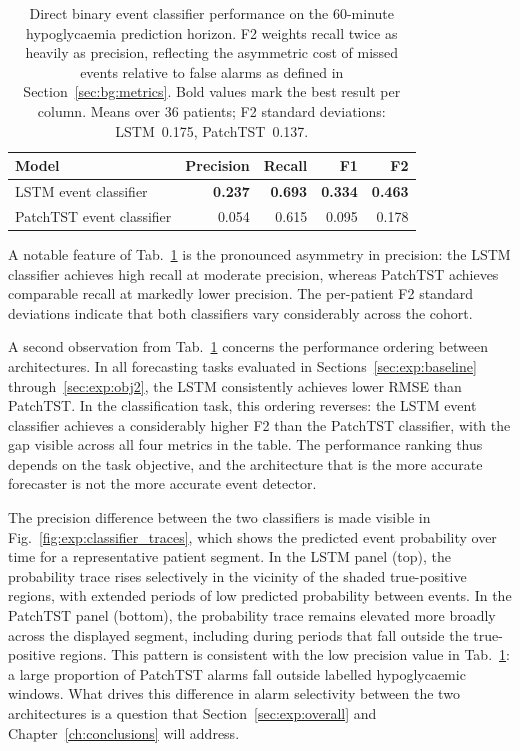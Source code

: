 \begin{table}[tbp]
\centering
\small
\caption{Direct binary event classifier performance on the 60-minute hypoglycaemia prediction horizon. F2 weights recall twice as heavily as precision, reflecting the asymmetric cost of missed events relative to false alarms as defined in Section~\ref{sec:bg:metrics}. Bold values mark the best result per column. Means over 36 patients; F2 standard deviations: LSTM~0.175, PatchTST~0.137.}
\label{tab:exp:classifiers}
\begin{tabular}{lrrrr}
\toprule
Model & Precision & Recall & F1 & F2 \\
\midrule
LSTM event classifier     & \textbf{0.237} & \textbf{0.693} & \textbf{0.334} & \textbf{0.463} \\
PatchTST event classifier & 0.054          & 0.615          & 0.095          & 0.178          \\
\bottomrule
\end{tabular}
\end{table}

A notable feature of Tab.~\ref{tab:exp:classifiers} is the pronounced asymmetry in precision: the LSTM classifier achieves high recall at moderate precision, whereas PatchTST achieves comparable recall at markedly lower precision. The per-patient F2 standard deviations indicate that both classifiers vary considerably across the cohort.

A second observation from Tab.~\ref{tab:exp:classifiers} concerns the performance ordering between architectures. In all forecasting tasks evaluated in Sections~\ref{sec:exp:baseline} through~\ref{sec:exp:obj2}, the LSTM consistently achieves lower RMSE than PatchTST. In the classification task, this ordering reverses: the LSTM event classifier achieves a considerably higher F2 than the PatchTST classifier, with the gap visible across all four metrics in the table. The performance ranking thus depends on the task objective, and the architecture that is the more accurate forecaster is not the more accurate event detector.


The precision difference between the two classifiers is made visible in Fig.~\ref{fig:exp:classifier_traces}, which shows the predicted event probability over time for a representative patient segment. In the LSTM panel (top), the probability trace rises selectively in the vicinity of the shaded true-positive regions, with extended periods of low predicted probability between events. In the PatchTST panel (bottom), the probability trace remains elevated more broadly across the displayed segment, including during periods that fall outside the true-positive regions. This pattern is consistent with the low precision value in Tab.~\ref{tab:exp:classifiers}: a large proportion of PatchTST alarms fall outside labelled hypoglycaemic windows. What drives this difference in alarm selectivity between the two architectures is a question that Section~\ref{sec:exp:overall} and Chapter~\ref{ch:conclusions} will address.

